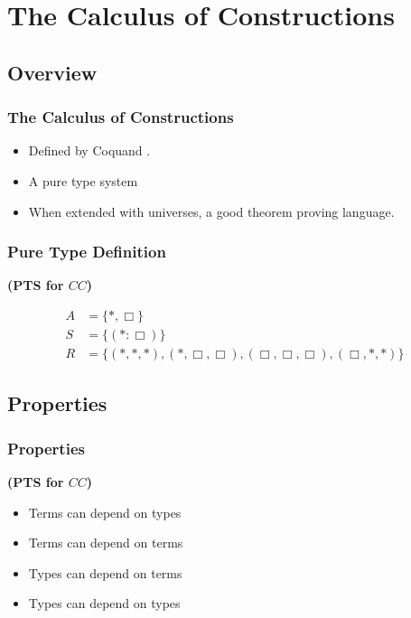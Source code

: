 \section[$CC$]{The Calculus of Constructions}

\subsection[Overview]{Overview}

\begin{frame}
\frametitle{The Calculus of Constructions}
\begin{itemize}
\item Defined by Coquand \citep{coquand1986calculus}.
\item A pure type system
\item When extended with universes, a good theorem proving language.

\end{itemize}
\end{frame}


\begin{frame}
\frametitle{Pure Type Definition}

\begin{definition}
\textbf{(PTS for $CC$)}

\begin{align}
A &= \{ *, \Box \}
\\
S &= \{ (* : \Box) \}
\\
R &= \{ (*,*,*),(*,\Box,\Box),(\Box,\Box,\Box),(\Box,*,*)\}
\end{align}  
\end{definition}

\end{frame}

\subsection{Properties}

\begin{frame}
\frametitle{Properties}

\textbf{(PTS for $CC$)}

\begin{itemize}
\item Terms can depend on types
\item Terms can depend on terms
\item Types can depend on terms
\item Types can depend on types
\end{itemize}

\end{frame}


